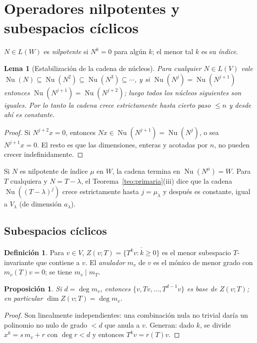 \documentclass{article}
\newcommand{\gen}[1]{\overline{\{#1\}}}          %
\DeclareMathOperator{\Nu}{Nu}
\theoremstyle{plain}
\newtheorem{proposicion}[teorema]{Proposición}
\newtheorem{lema}[teorema]{Lema}
\theoremstyle{definition}
\newtheorem{definicion}[teorema]{Definición}
\theoremstyle{remark}
\begin{document}
\section{Operadores nilpotentes y subespacios cíclicos}

\(N\in L(W)\) es \emph{nilpotente} si \(N^k=0\) para algún \(k\); el menor tal \(k\) es su \emph{índice}.

\begin{lema}[Estabilización de la cadena de núcleos]\label{lema:estab}
    Para cualquier \(N\in L(V)\) vale \(\Nu(N)\subseteq\Nu(N^2)\subseteq\Nu(N^3)\subseteq\cdots\), y si \(\Nu(N^j)=\Nu(N^{j+1})\) entonces \(\Nu(N^{j+1})=\Nu(N^{j+2})\); luego todos los núcleos siguientes son iguales. Por lo tanto la cadena crece estrictamente hasta cierto paso \(\le n\) y desde ahí es constante.
\end{lema}
\begin{proof}
    Si \(N^{j+2}x=0\), entonces \(Nx\in\Nu(N^{j+1})=\Nu(N^j)\), o sea \(N^{j+1}x=0\). El resto es que las dimensiones, enteras y acotadas por \(n\), no pueden crecer indefinidamente.
\end{proof}

Si \(N\) es nilpotente de índice \(\mu\) en \(W\), la cadena termina en \(\Nu(N^\mu)=W\). Para \(T\) cualquiera y \(N=T-\lambda\), el Teorema~\ref{teo:primaria}(iii) dice que la cadena \(\Nu((T-\lambda)^j)\) crece estrictamente hasta \(j=\mu_\lambda\) y después es constante, igual a \(V_\lambda\) (de dimensión \(a_\lambda\)).

\subsection{Subespacios cíclicos}

\begin{definicion}
    Para \(v\in V\), \(Z(v;T)=\gen{T^kv:k\ge0}\) es el menor subespacio \(T\)-invariante que contiene a \(v\). El \emph{anulador} \(m_v\) de \(v\) es el mónico de menor grado con \(m_v(T)v=0\); se tiene \(m_v\mid m_T\).
\end{definicion}

\begin{proposicion}\label{prop:ciclico}
    Si \(d=\deg m_v\), entonces \(\{v,Tv,\dots,T^{d-1}v\}\) es base de \(Z(v;T)\); en particular \(\dim Z(v;T)=\deg m_v\).
\end{proposicion}
\begin{proof}
    Son linealmente independientes: una combinación nula no trivial daría un polinomio no nulo de grado \(<d\) que anula a \(v\). Generan: dado \(k\), se divide \(x^k=s\,m_v+r\) con \(\deg r<d\) y entonces \(T^kv=r(T)v\).
\end{proof}
\end{document}
